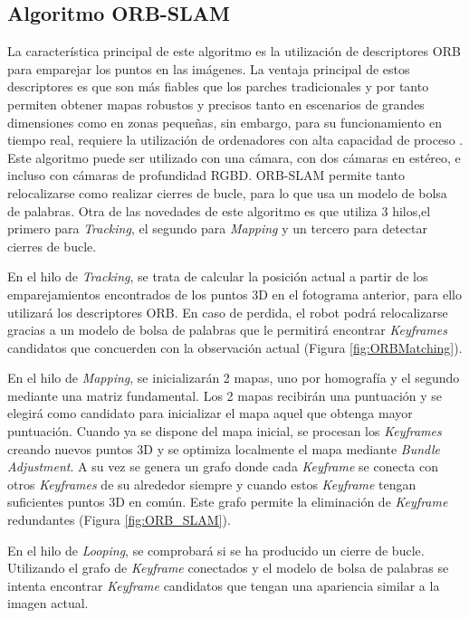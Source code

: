 \subsection{Algoritmo ORB-SLAM}
La característica principal de este algoritmo es la utilización de descriptores ORB para emparejar los puntos en las imágenes. La ventaja principal de estos descriptores es que son más fiables 
que los parches tradicionales y por tanto permiten obtener mapas robustos y precisos tanto en escenarios de grandes dimensiones como en zonas pequeñas, sin embargo, para su funcionamiento en tiempo real, requiere la utilización de ordenadores con alta capacidad de proceso \cite{Mur2015orb}.
Este algoritmo puede ser utilizado con una cámara, con dos cámaras en estéreo, e incluso con cámaras de profundidad RGBD. ORB-SLAM permite tanto relocalizarse como realizar cierres de bucle, para lo que usa un modelo de bolsa de palabras\cite{galvez2012bags}.
Otra de las novedades de este algoritmo es que utiliza 3 hilos,el primero para \textit{Tracking}, el segundo para \textit{Mapping} y un tercero para detectar cierres de bucle. 

En el hilo de \textit{Tracking}, se trata de calcular la posición actual a partir de los emparejamientos encontrados de los puntos 3D en el fotograma anterior, para ello utilizará los descriptores ORB.
En caso de perdida, el robot podrá relocalizarse gracias a un modelo de bolsa de palabras que le permitirá encontrar \textit{Keyframes} candidatos que concuerden con la observación actual (Figura \ref{fig:ORBMatching}).

En el hilo de \textit{Mapping}, se inicializarán 2 mapas, uno por homografía y el segundo mediante una matriz fundamental. Los 2 mapas recibirán una puntuación y se elegirá como candidato para inicializar el mapa aquel que obtenga mayor puntuación. Cuando ya se dispone del mapa inicial, se procesan los \textit{Keyframes} creando nuevos puntos 3D y se optimiza localmente el mapa mediante \textit{Bundle Adjustment}. A su vez se genera un grafo donde cada \textit{Keyframe} se conecta con otros \textit{Keyframes} de su alrededor siempre y cuando estos \textit{Keyframe} tengan suficientes puntos 3D en común. Este grafo permite la eliminación de \textit{Keyframe} redundantes (Figura \ref{fig:ORB_SLAM}).

En el hilo de \textit{Looping}, se comprobará si se ha producido un cierre de bucle. Utilizando el grafo de \textit{Keyframe} conectados y el modelo de bolsa de palabras se intenta encontrar \textit{Keyframe} candidatos que tengan una apariencia similar a la imagen actual.

